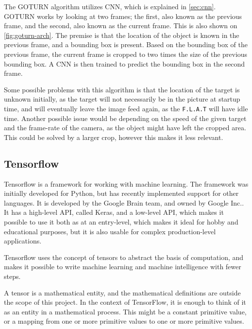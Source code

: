 The GOTURN algorithm utilizes CNN, which is explained in \autoref{sec:cnn}.
GOTURN works by looking at two frames; the first, also known as the previous frame, and the second, also known as the current frame.
This is also shown on \autoref{fig:goturn-arch}.
The premise is that the location of the object is known in the previous frame, and a bounding box is present.
Based on the bounding box of the previous frame, the current frame is cropped to two times the size of the previous bounding box.
A CNN is then trained to predict the bounding box in the second frame.

Some possible problems with this algorithm is that the location of the target is unknown initially, as the target will not necessarily be in the picture at startup time, and will eventually leave the image feed again, as the \texttt{F.L.A.T} will have idle time.
Another possible issue would be depending on the speed of the given target and the frame-rate of the camera, as the object might have left the cropped area. 
This could be solved by a larger crop, however this makes it less relevant.


\subsection{Tensorflow}
Tensorflow is a framework for working with machine learning\cite{tensorflow2015-whitepaper}.
The framework was initially developed for Python, but has recently implemented support for other languages.
It is developed by the Google Brain team, and owned by Google Inc.\cite{tensorflow-attribution}.
It has a high-level API, called Keras, and a low-level API, which makes it possible to use it both as at an entry-level, which makes it ideal for hobby and educational purposes, but it is also usable for complex production-level applications.

Tensorflow uses the concept of tensors to abstract the basis of computation, and makes it possible to write machine learning and machine intelligence with fewer steps.

A tensor is a mathematical entity, and the mathematical definitions are outside the scope of this project.
In the context of TensorFlow, it is enough to think of it as an entity in a mathematical process.
This might be a constant primitive value, or a mapping from one or more primitive values to one or more primitive values.

